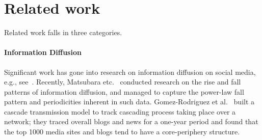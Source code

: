 \section{Related work}
Related work falls in three categories.
\paragraph{Information Diffusion}
Significant work has gone into research on information diffusion on
social media,
e.g., see~\cite{Cha10measuringuser,Kwak:2010:TSN:1772690.1772751,Romero:2011:DMI:1963405.1963503,Yang_predictingthe}.
Recently, Matsubara etc.~\cite{matsubara2012rise}
conducted research on the rise and fall patterns of information diffusion, and managed to
capture the power-law fall pattern and periodicities inherent in such data.
Gomez-Rodriguez et al.~\cite{GomezRodriguez:2010:IND:1835804.1835933}
built a cascade transmission model to track cascading process taking place over a network; they traced overall blogs and news for a one-year period and found that the top 1000 media sites and blogs tend to have a
core-periphery structure.
%
